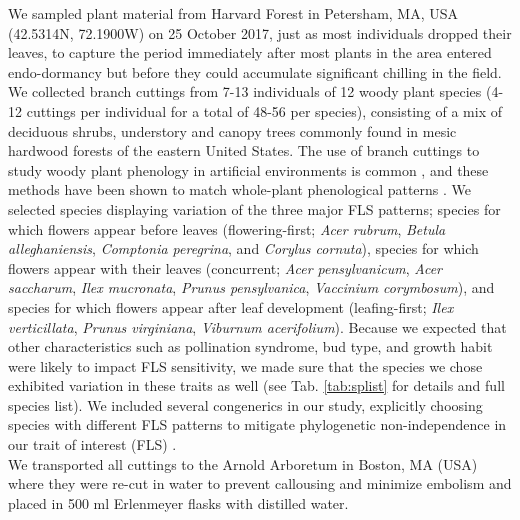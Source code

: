 \documentclass[12pt]{article}\usepackage[]{graphicx}\usepackage[]{color}
\begin{document}
\noindent We sampled plant material from Harvard Forest in Petersham, MA, USA (42.5314\degree N, 72.1900\degree W) on 25 October 2017, just as most individuals dropped their leaves, to capture the period immediately after most plants in the area entered endo-dormancy but before they could accumulate significant chilling in the field. We collected branch cuttings from 7-13 individuals of 12 woody plant species (4-12 cuttings per individual for a total of 48-56 per species), consisting of a mix of deciduous shrubs, understory and canopy trees commonly found in mesic hardwood forests of the eastern United States. The use of branch cuttings to study woody plant phenology in artificial environments is common \citep{Ettinger:2020aa}, and these methods have been shown to match whole-plant phenological patterns  \citep{Vitasse:2014aa,Primack2015}.
We selected species displaying variation of the three major FLS patterns; species for which flowers appear before leaves (flowering-first; \textit{Acer rubrum}, \textit{Betula alleghaniensis}, \textit{Comptonia peregrina}, and \textit{Corylus cornuta}), species for which flowers appear with their leaves (concurrent; \textit{Acer pensylvanicum}, \textit{Acer saccharum}, \textit{Ilex mucronata}, \textit{Prunus pensylvanica}, \textit{Vaccinium corymbosum}), and species for which flowers appear after leaf development (leafing-first; \textit{Ilex verticillata}, \textit{Prunus virginiana}, \textit{Viburnum acerifolium}). Because we expected that other characteristics such as pollination syndrome, bud type, and growth habit were likely to impact FLS sensitivity, we made sure that the species we chose exhibited variation in these traits as well  (see Tab. \ref{tab:splist} for details and full species list).  We included several congenerics in our study, explicitly choosing species with different FLS patterns to mitigate phylogenetic non-independence in our trait of interest (FLS) \citep{Revell:2010aa}.\\

We transported all cuttings to the Arnold Arboretum in Boston, MA (USA) where they were re-cut in water to prevent callousing and minimize embolism and placed in 500 ml Erlenmeyer flasks with distilled water.\\ 
\end{document}
